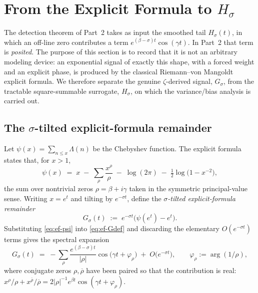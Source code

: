 
\section{From the Explicit Formula to $H_\sigma$}\label{sec:explicit-formula}

The detection theorem of Part~2 takes as input the smoothed tail $H_\sigma(t)$,
in which an off-line zero contributes a term $e^{(\beta-\sigma)t}\cos(\gamma t)$.
In Part~2 that term is \emph{posited}. The purpose of this section is to record
that it is not an arbitrary modeling device: an exponential signal of exactly
this shape, with a forced weight and an explicit phase, is produced by the
classical Riemann--von Mangoldt explicit formula. We therefore separate the
genuine $\zeta$-derived signal, $G_\sigma$, from the tractable square-summable
surrogate, $H_\sigma$, on which the variance/bias analysis is carried out.

\subsection{The $\sigma$-tilted explicit-formula remainder}

Let $\psi(x)=\sum_{n\le x}\Lambda(n)$ be the Chebyshev function. The explicit
formula \cite{titchmarsh,iwaniec-kowalski} states that, for $x>1$,
\begin{equation}
\psi(x) \;=\; x \;-\; \sum_{\rho}\frac{x^{\rho}}{\rho}
        \;-\; \log(2\pi) \;-\; \tfrac12\log\!\bigl(1-x^{-2}\bigr),
\label{eq:ef-psi}
\end{equation}
the sum over nontrivial zeros $\rho=\beta+i\gamma$ taken in the symmetric
principal-value sense. Writing $x=e^{t}$ and tilting by $e^{-\sigma t}$, define
the \emph{$\sigma$-tilted explicit-formula remainder}
\begin{equation}
G_\sigma(t) \;:=\; e^{-\sigma t}\bigl(\psi(e^{t})-e^{t}\bigr).
\label{eq:ef-Gdef}
\end{equation}
Substituting \eqref{eq:ef-psi} into \eqref{eq:ef-Gdef} and discarding the
elementary $O(e^{-\sigma t})$ terms gives the spectral expansion
\begin{equation}
G_\sigma(t) \;=\; -\sum_{\rho}\frac{e^{(\beta-\sigma)t}}{|\rho|}
                 \cos\!\bigl(\gamma t+\varphi_\rho\bigr)\;+\;O\!\bigl(e^{-\sigma t}\bigr),
\qquad \varphi_\rho:=\arg(1/\rho),
\label{eq:ef-spectral}
\end{equation}
where conjugate zeros $\rho,\overline{\rho}$ have been paired so that the
contribution is real: $x^{\rho}/\rho + x^{\overline{\rho}}/\overline{\rho}
= 2|\rho|^{-1}e^{\beta t}\cos(\gamma t+\varphi_\rho)$.

